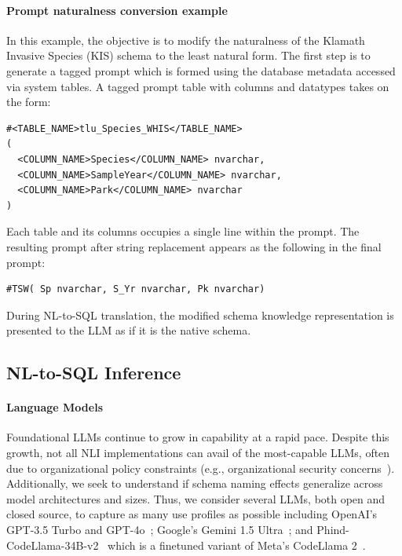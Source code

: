 \paragraph{Prompt naturalness conversion example}
In this example, the objective is to modify the naturalness of the Klamath Invasive Species (KIS) schema to the least natural form.
The first step is to generate a tagged prompt which is formed using the database metadata accessed via system tables.
A tagged prompt table with columns and datatypes takes on the form:
\begin{verbatim}
#<TABLE_NAME>tlu_Species_WHIS</TABLE_NAME>
( 
  <COLUMN_NAME>Species</COLUMN_NAME> nvarchar, 
  <COLUMN_NAME>SampleYear</COLUMN_NAME> nvarchar, 
  <COLUMN_NAME>Park</COLUMN_NAME> nvarchar
)
\end{verbatim}
Each table and its columns occupies a single line within the prompt.
The resulting prompt after string replacement appears as the following in the final prompt:
\begin{verbatim}
#TSW( Sp nvarchar, S_Yr nvarchar, Pk nvarchar)
\end{verbatim}

During NL-to-SQL translation, the modified schema knowledge representation is presented to the LLM as if it is the native schema.


\subsection{NL-to-SQL Inference}

\paragraph{\textbf{Language Models}}
Foundational LLMs continue to grow in capability at a rapid pace.
Despite this growth, not all NLI implementations can avail of the most-capable LLMs, often due to organizational policy constraints (e.g., organizational security concerns~\cite{gsa-llm-directive}).
Additionally, we seek to understand if schema naming effects generalize across model architectures and sizes.
Thus, we consider several LLMs, both open and closed source, to capture as many use profiles as possible including OpenAI's GPT-3.5 Turbo and GPT-4o~\cite{openai-chatgpt-blog-post, openai-api-documentation}; Google's Gemini 1.5 Ultra~\cite{geminiteam2024gemini, geminiteam2024gemini15}; and Phind-CodeLlama-34B-v2~\cite{phind2022phindcodellama} which is a finetuned variant of Meta's CodeLlama 2~\cite{roziere2023code}.

